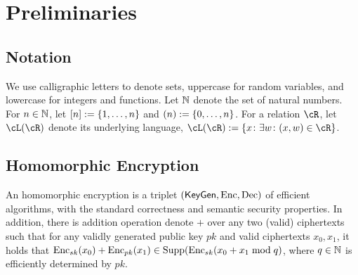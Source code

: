 \section{Preliminaries}\label{sec:Preliminaries}

\subsection{Notation} 
We use calligraphic letters to denote sets, uppercase for random variables, and lowercase for integers and functions. %
Let ${\mathbb{N}}$ denote the set of natural numbers.  For $n\in {\mathbb{N}}$, let $[n] \eqdef \set{1,\ldots,n}$ and $(n) \eqdef \set{0,\ldots,n}$.  For a relation $\cR$, let $\cL(\cR)$ denote its underlying language, \ie  $\cL(\cR) \eqdef \set{x\colon \exists w \colon (x,w) \in \cR}$.    


\subsection{Homomorphic Encryption}

An homomorphic encryption is a triplet $(\mathsf{KeyGen},\operatorname{Enc},\operatorname{Dec})$ of efficient algorithms, with the standard correctness and semantic security properties.  In addition, there is addition operation denote $+$ over any two (valid) ciphertexts  such that for any validly generated public key  $pk$ and valid ciphertexts $x_0,x_1$, it holds that  $\operatorname{Enc}_{sk}(x_0) + \operatorname{Enc}_{pk}(x_1)  \in \operatorname{Supp}(\operatorname{Enc}_{sk}(x_0+ x_1 \bmod q)$, where $q\in {\mathbb{N}}$ is efficiently determined by $pk$.

